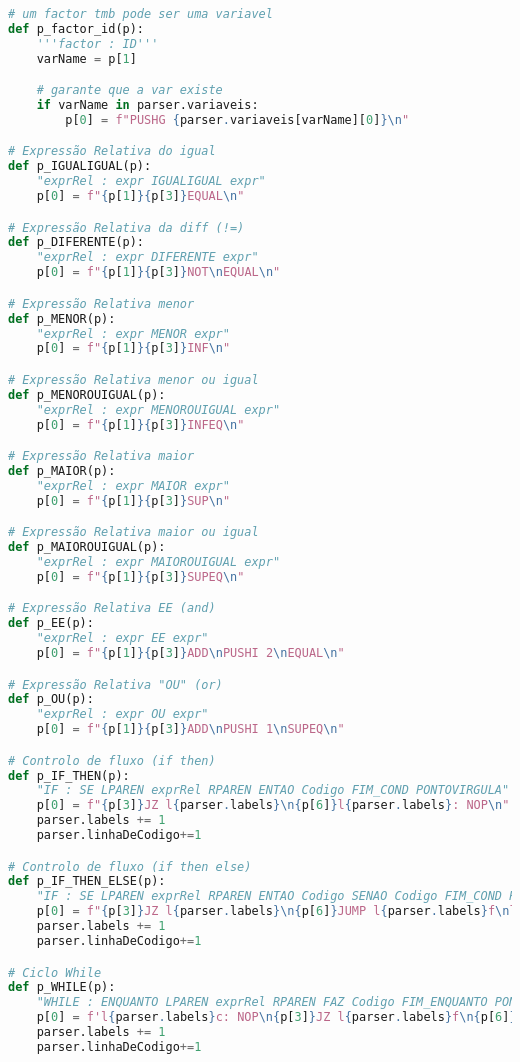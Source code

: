\documentclass[11pt,a4paper]{report}
\begin{document}
\begin{scriptsize}
\begin{lstlisting}[language=python]
# um factor tmb pode ser uma variavel
def p_factor_id(p):
    '''factor : ID'''
    varName = p[1]

    # garante que a var existe
    if varName in parser.variaveis:
        p[0] = f"PUSHG {parser.variaveis[varName][0]}\n"

# Expressão Relativa do igual
def p_IGUALIGUAL(p):
    "exprRel : expr IGUALIGUAL expr"
    p[0] = f"{p[1]}{p[3]}EQUAL\n"

# Expressão Relativa da diff (!=)
def p_DIFERENTE(p):
    "exprRel : expr DIFERENTE expr"
    p[0] = f"{p[1]}{p[3]}NOT\nEQUAL\n"

# Expressão Relativa menor
def p_MENOR(p):
    "exprRel : expr MENOR expr"
    p[0] = f"{p[1]}{p[3]}INF\n"

# Expressão Relativa menor ou igual
def p_MENOROUIGUAL(p):
    "exprRel : expr MENOROUIGUAL expr"
    p[0] = f"{p[1]}{p[3]}INFEQ\n"

# Expressão Relativa maior
def p_MAIOR(p):
    "exprRel : expr MAIOR expr"
    p[0] = f"{p[1]}{p[3]}SUP\n"

# Expressão Relativa maior ou igual
def p_MAIOROUIGUAL(p):
    "exprRel : expr MAIOROUIGUAL expr"
    p[0] = f"{p[1]}{p[3]}SUPEQ\n"

# Expressão Relativa EE (and)
def p_EE(p):
    "exprRel : expr EE expr" 
    p[0] = f"{p[1]}{p[3]}ADD\nPUSHI 2\nEQUAL\n"

# Expressão Relativa "OU" (or)
def p_OU(p):
    "exprRel : expr OU expr"
    p[0] = f"{p[1]}{p[3]}ADD\nPUSHI 1\nSUPEQ\n"

# Controlo de fluxo (if then)
def p_IF_THEN(p):
    "IF : SE LPAREN exprRel RPAREN ENTAO Codigo FIM_COND PONTOVIRGULA"
    p[0] = f"{p[3]}JZ l{parser.labels}\n{p[6]}l{parser.labels}: NOP\n"  # NOP não faz nada na vm
    parser.labels += 1
    parser.linhaDeCodigo+=1

# Controlo de fluxo (if then else)
def p_IF_THEN_ELSE(p):
    "IF : SE LPAREN exprRel RPAREN ENTAO Codigo SENAO Codigo FIM_COND PONTOVIRGULA"
    p[0] = f"{p[3]}JZ l{parser.labels}\n{p[6]}JUMP l{parser.labels}f\nl{parser.labels}: NOP\n{p[8]}l{parser.labels}f: NOP\n" # NOP não faz nada na vm
    parser.labels += 1
    parser.linhaDeCodigo+=1

# Ciclo While
def p_WHILE(p):
    "WHILE : ENQUANTO LPAREN exprRel RPAREN FAZ Codigo FIM_ENQUANTO PONTOVIRGULA"
    p[0] = f'l{parser.labels}c: NOP\n{p[3]}JZ l{parser.labels}f\n{p[6]}JUMP l{parser.labels}c\nl{parser.labels}f: NOP\n' # NOP não faz nada na vm
    parser.labels += 1
    parser.linhaDeCodigo+=1


\end{lstlisting}
\end{scriptsize}
\end{document}
